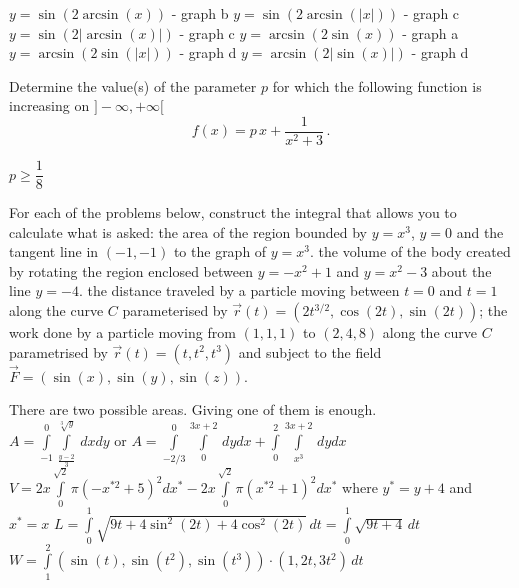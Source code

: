 \begin{Answer}
\begin{multicols}{2}

\Question $y=\sin(2\arcsin(x))$ - graph b
\Question  $y=\sin(2\arcsin(|x|))$ - graph c
\Question  $y=\sin(2|\arcsin(x)|)$ - graph c
\Question  $y=\arcsin(2\sin(x))$ - graph a
\Question  $y=\arcsin(2\sin(|x|))$ - graph d
\Question  $y=\arcsin(2|\sin(x)|)$ - graph d
 \EndCurrentQuestion
\end{multicols}
\end{Answer}

\begin{Exercise} %
Determine the value(s) of the parameter $p$ for which the following function is increasing on $]-\infty,+\infty[$
$$
f(x)=p\,x+\dfrac{1}{x^2+3}\,.
$$
\end{Exercise}

\begin{Answer}\phantom{}
$p \geq \dfrac{1}{8}$
\end{Answer}

\begin{Exercise} %
For each of the problems below, construct the integral that allows you to calculate what is asked:
\Question the area of the region bounded by $y=x^3$, $y=0$ and the tangent line in $(-1,-1)$ to the graph of $y=x^3$.
\Question the volume of the body created by rotating the region enclosed between $y=-x^2+1$ and $y=x^2-3$ about the line $y=-4$.
\Question the distance traveled by a particle moving between $t=0$ and $t=1$ along the curve $C$ parameterised by $\vec{r}(t)=\left(2t^{3/2},\cos(2t),\sin(2t)\right)$;
\Question the work done by a particle moving from $(1,1,1)$ to $(2,4,8)$ along the curve $C$ parametrised by $\vec{r}(t)=\left(t,t^2,t^3\right)$ and subject to the field $\vec{F}=\left(\sin(x),\sin(y),\sin(z)\right)$.
\EndCurrentQuestion
\end{Exercise}

\begin{Answer}\phantom{}

\Question There are two possible areas. Giving one of them is enough. \\

$A = \displaystyle \int \limits_{-1}^0 \int\limits_{\frac{y-2}{3}}^{\sqrt[3]{y}} \, dx dy $ \quad or \quad $A= \displaystyle  \int\limits_{-2/3}^0 \int\limits_{0}^{3x+2} \, dy dx + \int\limits_{0}^2 \int\limits_{x^3}^{3x+2} \, dy dx$ 
\Question $V = 2x \displaystyle \int\limits_{0}^{\sqrt{2}} \pi \left( - x^{*2}+5 \right)^2 dx^* - 2x \displaystyle \int\limits_{0}^{\sqrt{2}} \pi \left( x^{*2}+1 \right)^2 dx^*$ \quad where $y^* = y+4$ \; and \; $x^* = x$
\Question $L= \displaystyle \int\limits_{0}^{1} \sqrt{9t + 4 \sin^2(2t) + 4 \cos^2(2t)} \, dt= \displaystyle \int\limits_{0}^{1} \sqrt{9t + 4 } \, dt$
\Question $W = \displaystyle \int\limits_{1}^{2} \left(\sin(t), \sin\left(t^2 \right), \sin\left(t^3 \right) \right) \cdot \left( 1, 2t, 3t^2\right) \, dt $
\end{Answer}

